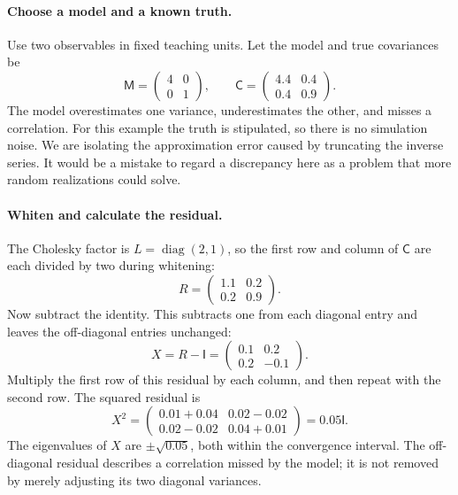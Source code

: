 \documentclass[11pt]{article}
\newcommand{\Cov}{\mathsf{C}}
\newcommand{\M}{\mathsf{M}}
\newcommand{\I}{\mathsf{I}}
\begin{document}
\paragraph{Choose a model and a known truth.}
Use two observables in fixed teaching units. Let the model and true
covariances be
\begin{equation}
 \M=\begin{pmatrix}4&0\\0&1\end{pmatrix},\qquad
 \Cov=\begin{pmatrix}4.4&0.4\\0.4&0.9\end{pmatrix}.
\end{equation}
The model overestimates one variance, underestimates the other, and misses
a correlation. For this example the truth is stipulated, so there is no
simulation noise. We are isolating the approximation error caused by
truncating the inverse series. It would be a mistake to regard a discrepancy
here as a problem that more random realizations could solve.

\paragraph{Whiten and calculate the residual.}
The Cholesky factor is $L=\operatorname{diag}(2,1)$, so the first row and
column of $\Cov$ are each divided by two during whitening:
\begin{equation}
 R=\begin{pmatrix}1.1&0.2\\0.2&0.9\end{pmatrix}.
\end{equation}
Now subtract the identity. This subtracts one from each diagonal entry
and leaves the off-diagonal entries unchanged:
\begin{equation}
 X=R-\I=\begin{pmatrix}0.1&0.2\\0.2&-0.1\end{pmatrix}.
\end{equation}
Multiply the first row of this residual by each column, and then repeat
with the second row. The squared residual is
\begin{equation}
 X^2=\begin{pmatrix}0.01+0.04&0.02-0.02\\
                         0.02-0.02&0.04+0.01\end{pmatrix}
 =0.05\I.
\end{equation}
The eigenvalues of $X$ are $\pm\sqrt{0.05}$, both within the convergence
interval. The off-diagonal residual describes a correlation missed by the
model; it is not removed by merely adjusting its two diagonal variances.
\end{document}
